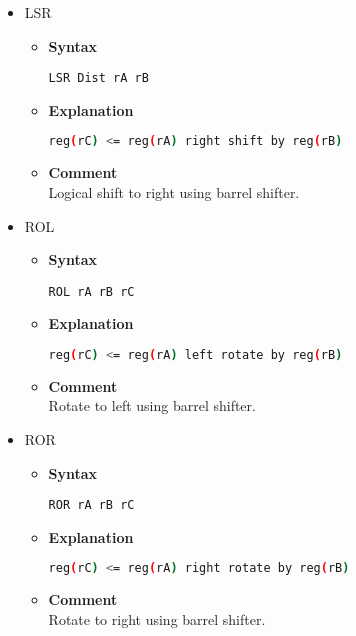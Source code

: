 \begin{itemize}
    \item LSR
    \begin{itemize}
        \item \textbf{Syntax}
        \begin{lstlisting}[language={[markII]Assembler}, frame=single]
    LSR Dist rA rB
        \end{lstlisting}
        \item \textbf{Explanation}
        \begin{lstlisting}[language=bash, frame=single]
    reg(rC) <= reg(rA) right shift by reg(rB)
        \end{lstlisting}
        \item \textbf{Comment} \\
    Logical shift to right using barrel shifter.
    \end{itemize}

    \item ROL
    \begin{itemize}
        \item \textbf{Syntax}
        \begin{lstlisting}[language={[markII]Assembler}, frame=single]
    ROL rA rB rC
        \end{lstlisting}
        \item \textbf{Explanation}
        \begin{lstlisting}[language=bash, frame=single]
    reg(rC) <= reg(rA) left rotate by reg(rB)
        \end{lstlisting}
        \item \textbf{Comment} \\
    Rotate to left using barrel shifter.
    \end{itemize}

    \item ROR
    \begin{itemize}
        \item \textbf{Syntax}
        \begin{lstlisting}[language={[markII]Assembler}, frame=single]
    ROR rA rB rC
        \end{lstlisting}
        \item \textbf{Explanation}
        \begin{lstlisting}[language=bash, frame=single]
    reg(rC) <= reg(rA) right rotate by reg(rB)
        \end{lstlisting}
        \item \textbf{Comment} \\
    Rotate to right using barrel shifter.
    \end{itemize}


\end{itemize}
